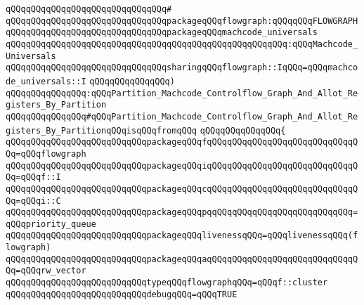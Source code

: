 \verb|qQQqqQQqqQQqqQQqqQQqqQQqqQQqqQQq#|\newline
\verb|qQQqqQQqqQQqqQQqqQQqqQQqqQQqqQQqpackageqQQqflowgraph:qQQqqQQqFLOWGRAPH|\newline
\newline
\verb|qQQqqQQqqQQqqQQqqQQqqQQqqQQqqQQqpackageqQQqmachcode_universals|\newline
\verb|qQQqqQQqqQQqqQQqqQQqqQQqqQQqqQQqqQQqqQQqqQQqqQQqqQQqqQQq:qQQqMachcode_Universals|\newline
\newline
\verb|qQQqqQQqqQQqqQQqqQQqqQQqqQQqqQQqsharingqQQqflowgraph::IqQQq=qQQqmachcode_universals::I|\newline
\verb|qQQqqQQqqQQqqQQq)|\newline
\verb|qQQqqQQqqQQqqQQq:qQQqPartition_Machcode_Controlflow_Graph_And_Allot_Registers_By_Partition|\newline
\verb|qQQqqQQqqQQqqQQq#qQQqPartition_Machcode_Controlflow_Graph_And_Allot_Registers_By_PartitionqQQqisqQQqfromqQQq|\newline
\verb|qQQqqQQqqQQqqQQq{|\newline
\verb|qQQqqQQqqQQqqQQqqQQqqQQqqQQqpackageqQQqfqQQqqQQqqQQqqQQqqQQqqQQqqQQqqQQq=qQQqflowgraph|\newline
\verb|qQQqqQQqqQQqqQQqqQQqqQQqqQQqpackageqQQqiqQQqqQQqqQQqqQQqqQQqqQQqqQQqqQQq=qQQqf::I|\newline
\verb|qQQqqQQqqQQqqQQqqQQqqQQqqQQqpackageqQQqcqQQqqQQqqQQqqQQqqQQqqQQqqQQqqQQq=qQQqi::C|\newline
\verb|qQQqqQQqqQQqqQQqqQQqqQQqqQQqpackageqQQqpqqQQqqQQqqQQqqQQqqQQqqQQqqQQq=qQQqpriority_queue|\newline
\verb|qQQqqQQqqQQqqQQqqQQqqQQqqQQqpackageqQQqlivenessqQQq=qQQqlivenessqQQq(flowgraph)|\newline
\verb|qQQqqQQqqQQqqQQqqQQqqQQqqQQqpackageqQQqaqQQqqQQqqQQqqQQqqQQqqQQqqQQqqQQq=qQQqrw_vector|\newline
\newline
\verb|qQQqqQQqqQQqqQQqqQQqqQQqqQQqtypeqQQqflowgraphqQQq=qQQqf::cluster|\newline
\newline
\verb|qQQqqQQqqQQqqQQqqQQqqQQqqQQqdebugqQQq=qQQqTRUE|\newline
\newline
